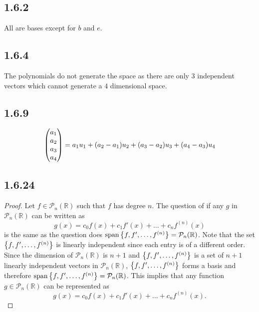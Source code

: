 \documentclass[12pt,titlepage]{extarticle}
\begin{document}
\subsection*{1.6.2}
All are bases except for $b$ and $e$.

\subsection*{1.6.4}
The polynomials do not generate the space as there are only $3$ independent vectors which cannot generate a $4$ dimensional space.

\subsection*{1.6.9}
\[
    \mqty(a_1 \\ a_2 \\ a_3 \\ a_4) = a_1 u_1 + (a_2 - a_1) u_2 + (a_3 - a_2) u_3 + (a_4 - a_3) u_4
\]


\subsection*{1.6.24}
\begin{proof}
	Let $f \in \mathcal{P}_n (\mathbb{R})$ such that $f$ has degree $n$. The question of if any $g$ in $\mathcal{P}_n(\mathbb{R})$ can be written as
	\[
		g(x) = c_0 f(x) + c_1 f'(x) + \ldots + c_n f^{(n)}(x)
	\]
	is the same as the question does $\operatorname{span}\qty{f, f', \ldots, f^{(n)}} = \mathcal{P}_n(\mathbb{R})$. Note that the set $\qty{f, f', \ldots, f^{(n)}}$ is linearly independent since each entry is of a different order. Since the dimension of $\mathcal{P}_n(\mathbb{R})$ is $n+1$ and $\qty{f, f', \ldots, f^{(n)}}$ is a set of $n+1$ linearly independent vectors in $\mathcal{P}_n(\mathbb{R})$, $\qty{f, f', \ldots, f^{(n)}}$ forms a basis and therefore $\operatorname{span}\qty{f, f', \ldots, f^{(n)}} = \mathcal{P}_n(\mathbb{R})$. This implies that any function $g \in \mathcal{P}_n(\mathbb{R})$ can be represented as
	\[
		g(x) = c_0 f(x) + c_1 f'(x) + \ldots + c_n f^{(n)}(x)
	.\]
\end{proof}
\end{document}

